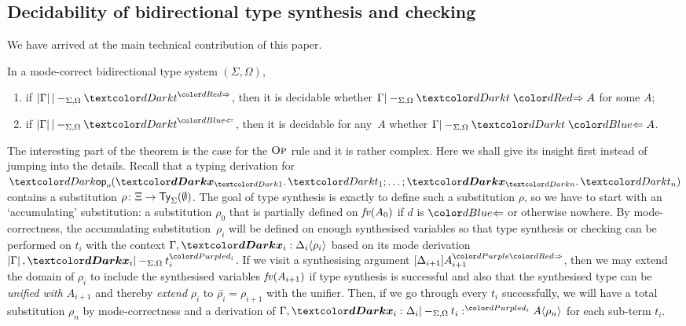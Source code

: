 
\subsection{Decidability of bidirectional type synthesis and checking}\label{subsec:bidirectional-synthesis-checking}

We have arrived at the main technical contribution of this paper.

\begin{theorem}\label{thm:bidirectional-type-synthesis-checking}
  In a mode-correct bidirectional type system $(\Sigma, \Omega)$,
  \begin{enumerate}
    \item if\/ $\erase{\Gamma} |-_{\Sigma, \Omega} \isTerm{t}^{\syn}$, then it is decidable whether $\Gamma |-_{\Sigma, \Omega} \isTerm{t} \syn A$ for some $A$;
    \item if\/ $\erase{\Gamma} |-_{\Sigma, \Omega} \isTerm{t}^{\chk}$, then it is decidable for any~$A$ whether $\Gamma |-_{\Sigma, \Omega} \isTerm{t} \chk A$.
  \end{enumerate}
\end{theorem}

The interesting part of the theorem is the case for the $\textnormal{\textsc{Op}}$ rule and it is rather complex.
Here we shall give its insight first instead of jumping into the details.
Recall that a typing derivation for $\tmOpts$ contains a substitution $\rho\colon \Xi \to \mathsf{Ty}_{\Sigma}(\emptyset)$.
The goal of type synthesis is exactly to define such a substitution $\rho$, so we have to start with an `accumulating' substitution: a substitution $\rho_0$ that is partially defined on $\mathit{fv}(A_0)$ if $d$ is $\chk$ or otherwise nowhere.
By mode-correctness, the accumulating substitution~$\rho_i$ will be defined on enough synthesised variables so that type synthesis or checking can be performed on $t_{i}$ with the context $\Gamma, \vars{x}_{i} : \simsub{\Delta_{i}}{\rho_{i}}$ based on its mode derivation $\erase{\Gamma}, \vars{x}_i |-_{\Sigma, \Omega} t_i^{\dir{d_i}}$.
If we visit a synthesising argument $\synbiarg[i+1]$, then we may extend the domain of $\rho_i$ to include the synthesised variables $\mathit{fv}(A_{i + 1})$ if type synthesis is successful and also that the synthesised type can be \emph{unified with $A_{i+ 1}$} and thereby \emph{extend} $\rho_i$ to $\bar{\rho_i} = \rho_{i+1}$ with the unifier.
Then, if we go through every $t_i$ successfully, we will have a total substitution $\rho_n$ by mode-correctness and a derivation of $\Gamma, \vars{x}_i : \Delta_i |-_{\Sigma, \Omega} t_i :^{\dir{d_i}} \simsub{A}{\rho_n}$ for each sub-term $t_i$.

